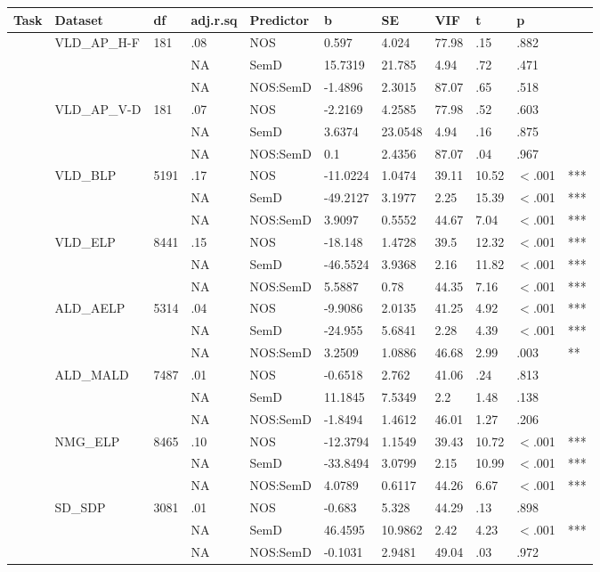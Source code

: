 \begin{table}[ht]
\centering
\begingroup\normalsize
\begin{tabular}{lllllllllll}
  \hline
Task & Dataset & df & adj.r.sq & Predictor & b & SE & VIF & t & p &  \\ 
  \hline
 & VLD\_AP\_H-F & 181 & .08 & NOS & 0.597 & 4.024 & 77.98 & .15 & .882 &   \\ 
   &  &  & NA & SemD & 15.7319 & 21.785 & 4.94 & .72 & .471 &   \\ 
   &  &  & NA & NOS:SemD & -1.4896 & 2.3015 & 87.07 & .65 & .518 &   \\ 
   & VLD\_AP\_V-D & 181 & .07 & NOS & -2.2169 & 4.2585 & 77.98 & .52 & .603 &   \\ 
   &  &  & NA & SemD & 3.6374 & 23.0548 & 4.94 & .16 & .875 &   \\ 
   &  &  & NA & NOS:SemD & 0.1 & 2.4356 & 87.07 & .04 & .967 &   \\ 
   & VLD\_BLP & 5191 & .17 & NOS & -11.0224 & 1.0474 & 39.11 & 10.52 & $<$.001 & *** \\ 
   &  &  & NA & SemD & -49.2127 & 3.1977 & 2.25 & 15.39 & $<$.001 & *** \\ 
   &  &  & NA & NOS:SemD & 3.9097 & 0.5552 & 44.67 & 7.04 & $<$.001 & *** \\ 
   & VLD\_ELP & 8441 & .15 & NOS & -18.148 & 1.4728 & 39.5 & 12.32 & $<$.001 & *** \\ 
   &  &  & NA & SemD & -46.5524 & 3.9368 & 2.16 & 11.82 & $<$.001 & *** \\ 
   &  &  & NA & NOS:SemD & 5.5887 & 0.78 & 44.35 & 7.16 & $<$.001 & *** \\ 
   & ALD\_AELP & 5314 & .04 & NOS & -9.9086 & 2.0135 & 41.25 & 4.92 & $<$.001 & *** \\ 
   &  &  & NA & SemD & -24.955 & 5.6841 & 2.28 & 4.39 & $<$.001 & *** \\ 
   &  &  & NA & NOS:SemD & 3.2509 & 1.0886 & 46.68 & 2.99 & .003 & ** \\ 
   & ALD\_MALD & 7487 & .01 & NOS & -0.6518 & 2.762 & 41.06 & .24 & .813 &   \\ 
   &  &  & NA & SemD & 11.1845 & 7.5349 & 2.2 & 1.48 & .138 &   \\ 
   &  &  & NA & NOS:SemD & -1.8494 & 1.4612 & 46.01 & 1.27 & .206 &   \\ 
   & NMG\_ELP & 8465 & .10 & NOS & -12.3794 & 1.1549 & 39.43 & 10.72 & $<$.001 & *** \\ 
   &  &  & NA & SemD & -33.8494 & 3.0799 & 2.15 & 10.99 & $<$.001 & *** \\ 
   &  &  & NA & NOS:SemD & 4.0789 & 0.6117 & 44.26 & 6.67 & $<$.001 & *** \\ 
   & SD\_SDP & 3081 & .01 & NOS & -0.683 & 5.328 & 44.29 & .13 & .898 &   \\ 
   &  &  & NA & SemD & 46.4595 & 10.9862 & 2.42 & 4.23 & $<$.001 & *** \\ 
   &  &  & NA & NOS:SemD & -0.1031 & 2.9481 & 49.04 & .03 & .972 &   \\ 
   \hline
\end{tabular}
\endgroup
\end{table}
